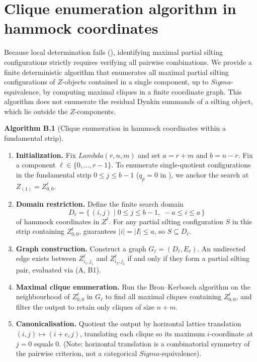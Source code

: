 \documentclass[11pt, a4paper]{article}
\theoremstyle{definition}
\def\Lambda{Lambda}%
\def\Sigma{Sigma}%
\def\mathcal#1{#1}%
\begin{document}
\section{Clique enumeration algorithm in hammock coordinates}
\label{app:algorithm}

Because local determination fails (), identifying maximal partial silting configurations strictly requires verifying all pairwise combinations. We provide a finite deterministic algorithm that enumerates all maximal partial silting configurations of $\mathcal Z$-objects contained in a single component, up to $\Sigma$-equivalence, by computing maximal cliques in a finite coordinate graph. This algorithm does not enumerate the residual Dynkin summands of a silting object, which lie outside the $\mathcal Z$-components.

\vspace{2mm}
\noindent\textbf{Algorithm B.1} (Clique enumeration in hammock coordinates within a fundamental strip).
\begin{enumerate}[label=\textbf{Step \arabic*.}, leftmargin=*]
\item \textbf{Initialization.} Fix $\Lambda(r,n,m)$ and set $a=r+m$ and $b=n-r$. Fix a component $\ell \in \{0,\ldots,r-1\}$. To enumerate single-quotient configurations in the fundamental strip $0 \le j \le b-1$ ($q_p = 0$ in ), we anchor the search at $Z_{(1)} = Z_{0,0}^\ell$.
\item \textbf{Domain restriction.} Define the finite search domain
\[
\mathcal{D}_\ell = \bigl\{\, (i, j) \;\big|\; 0 \le j \le b-1, \; -a \le i \le a \,\bigr\}
\]
of hammock coordinates in $\mathcal Z^\ell$. For any partial silting configuration $S$ in this strip containing $Z_{0,0}^\ell$,  guarantees $|i| = |I| \le a$, so $S \subseteq \mathcal{D}_\ell$.
\item \textbf{Graph construction.} Construct a graph $\mathcal{G}_\ell = (\mathcal{D}_\ell, E_\ell)$. An undirected edge exists between $Z_{i_1,j_1}^\ell$ and $Z_{i_2,j_2}^\ell$ if and only if they form a partial silting pair, evaluated via \textup{(A, B1)}.
\item \textbf{Maximal clique enumeration.} Run the Bron--Kerbosch algorithm on the neighbourhood of $Z_{0,0}^\ell$ in $\mathcal{G}_\ell$ to find all maximal cliques containing $Z_{0,0}^\ell$, and filter the output to retain only cliques of size $n+m$.
\item \textbf{Canonicalisation.} Quotient the output by horizontal lattice translation $(i,j) \mapsto (i+c, j)$, translating each clique so its maximum $i$-coordinate at $j=0$ equals $0$. (Note: horizontal translation is a combinatorial symmetry of the pairwise criterion, not a categorical $\Sigma$-equivalence).
\end{enumerate}
\end{document}
